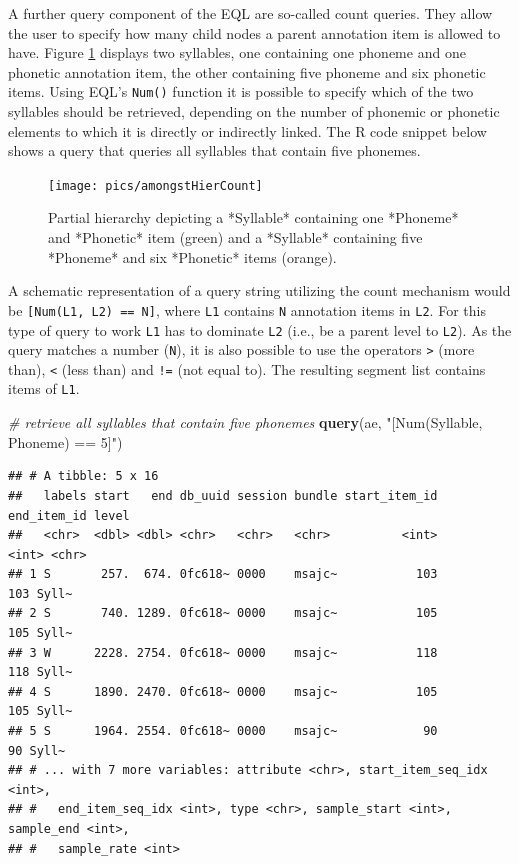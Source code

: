 \documentclass[]{book}
\newenvironment{Shaded}{\begin{snugshade}}{\end{snugshade}}
\newcommand{\CommentTok}[1]{\textcolor[rgb]{0.56,0.35,0.01}{\textit{#1}}}
\newcommand{\KeywordTok}[1]{\textcolor[rgb]{0.13,0.29,0.53}{\textbf{#1}}}
\newcommand{\NormalTok}[1]{#1}
\newcommand{\StringTok}[1]{\textcolor[rgb]{0.31,0.60,0.02}{#1}}
\begin{document}
A further query component of the EQL are so-called count queries. They allow the user to specify how many child nodes a parent annotation item is allowed to have. Figure \ref{fig:query-amongstHierCount} displays two syllables, one containing one phoneme and one phonetic annotation item, the other containing five phoneme and six phonetic items. Using EQL's \texttt{Num()} function it is possible to specify which of the two syllables should be retrieved, depending on the number of phonemic or phonetic elements to which it is directly or indirectly linked. The R code snippet below shows a query that queries all syllables that contain five phonemes.

\begin{figure}

{\centering \texttt{[image: pics/amongstHierCount]} 

}

\caption{Partial hierarchy depicting a *Syllable* containing one *Phoneme* and  *Phonetic* item (green) and a *Syllable* containing five *Phoneme* and six *Phonetic* items (orange).}\label{fig:query-amongstHierCount}
\end{figure}

A schematic representation of a query string utilizing the count mechanism would be \texttt{{[}Num(L1,\ L2)\ ==\ N{]}}, where \texttt{L1} contains \texttt{N} annotation items in \texttt{L2}. For this type of query to work \texttt{L1} has to dominate \texttt{L2} (i.e., be a parent level to \texttt{L2}). As the query matches a number (\texttt{N}), it is also possible to use the operators \texttt{\textgreater{}} (more than), \texttt{\textless{}} (less than) and \texttt{!=} (not equal to). The resulting segment list contains items of \texttt{L1}.

\begin{Shaded}
\begin{Highlighting}[]
\CommentTok{# retrieve all syllables that contain five phonemes}
\KeywordTok{query}\NormalTok{(ae, }\StringTok{"[Num(Syllable, Phoneme) == 5]"}\NormalTok{)}
\end{Highlighting}
\end{Shaded}

\begin{verbatim}
## # A tibble: 5 x 16
##   labels start   end db_uuid session bundle start_item_id end_item_id level
##   <chr>  <dbl> <dbl> <chr>   <chr>   <chr>          <int>       <int> <chr>
## 1 S       257.  674. 0fc618~ 0000    msajc~           103         103 Syll~
## 2 S       740. 1289. 0fc618~ 0000    msajc~           105         105 Syll~
## 3 W      2228. 2754. 0fc618~ 0000    msajc~           118         118 Syll~
## 4 S      1890. 2470. 0fc618~ 0000    msajc~           105         105 Syll~
## 5 S      1964. 2554. 0fc618~ 0000    msajc~            90          90 Syll~
## # ... with 7 more variables: attribute <chr>, start_item_seq_idx <int>,
## #   end_item_seq_idx <int>, type <chr>, sample_start <int>, sample_end <int>,
## #   sample_rate <int>
\end{verbatim}
\end{document}
